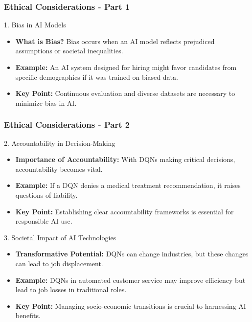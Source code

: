 \documentclass[aspectratio=169]{beamer}
\begin{document}
\begin{frame}[fragile]
    \frametitle{Ethical Considerations - Part 1}
    \begin{block}{1. Bias in AI Models}
        \begin{itemize}
            \item \textbf{What is Bias?}  
            Bias occurs when an AI model reflects prejudiced assumptions or societal inequalities.
            \item \textbf{Example:}  
            An AI system designed for hiring might favor candidates from specific demographics if it was trained on biased data.
            \item \textbf{Key Point:}  
            Continuous evaluation and diverse datasets are necessary to minimize bias in AI.
        \end{itemize}
    \end{block}
\end{frame}

\begin{frame}[fragile]
    \frametitle{Ethical Considerations - Part 2}
    \begin{block}{2. Accountability in Decision-Making}
        \begin{itemize}
            \item \textbf{Importance of Accountability:}  
            With DQNs making critical decisions, accountability becomes vital.
            \item \textbf{Example:}  
            If a DQN denies a medical treatment recommendation, it raises questions of liability.
            \item \textbf{Key Point:}  
            Establishing clear accountability frameworks is essential for responsible AI use.
        \end{itemize}
    \end{block}

    \begin{block}{3. Societal Impact of AI Technologies}
        \begin{itemize}
            \item \textbf{Transformative Potential:}  
            DQNs can change industries, but these changes can lead to job displacement.
            \item \textbf{Example:}  
            DQNs in automated customer service may improve efficiency but lead to job losses in traditional roles.
            \item \textbf{Key Point:}  
            Managing socio-economic transitions is crucial to harnessing AI benefits.
        \end{itemize}
    \end{block}
\end{frame}
\end{document}
